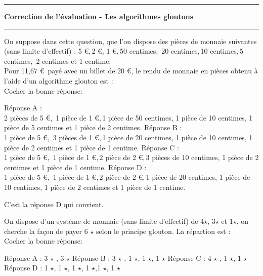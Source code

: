 \documentclass[a4paper,12,answers
]{exam}
\begin{document}
\chead{}

\lfoot{                      }
\hrule

\begin{center}
	\textbf{\Large{Correction de l'évaluation - Les algorithmes gloutons }}\end{center}
\hrule
\vskip0.5cm
	\begin{questions}
	\question On suppose dans cette question, que l'on dispose des pièces de monnaie suivantes (sans limite d'effectif) : 5 \euro,\,2 \euro, 1 \euro,\,50 centimes, \,20 centimes,\,10 centimes,\,5 centimes, \,2 centimes et 1 centime.\\
	Pour 11,67 \euro\, payé avec un billet de 20 \euro, le rendu de monnaie en pièces obtenu à l'aide d'un algorithme glouton est : \\
	Cocher la bonne réponse:
			\begin{checkboxes}
			\choice Réponse A :\\
			2 pièces de 5 \euro, \,1 pièce de 1 \euro,\,1 pièce de 50 centimes, 1 pièce de 10 centimes, 1 pièce de 5 centimes et 1 pièce de 2 centimes.
			\choice Réponse B :\\
			1 pièce de 5 \euro, \,3 pièces de 1 \euro,\,1 pièce de 20 centimes, 1 pièce de 10 centimes, 1 pièce de 2 centimes et 1 pièce de 1 centime.
			\choice Réponse C : \\
			1 pièce de 5 \euro, \,1 pièce de 1 \euro,\,2 pièce de 2 \euro,\,3 pièces de 10 centimes, 1 pièce de 2 centimes et 1 pièce de 1 centime.
			\choice Réponse D :\\ 1 pièce de 5 \euro, \,1 pièce de 1 \euro,\,2 pièce de 2 \euro,\,1 pièce de 20 centimes, 1 pièce de 10 centimes,  1 pièce de 2 centimes et 1 pièce de 1 centime.
		\end{checkboxes}	

\begin{solution}
C'est la réponse D qui  convient.

\end{solution}
\medskip
	\question On dispose d'un système de monnaie (sans limite d'effectif) de 4$\star$, 3$\star$ et 1$\star$, on cherche la façon de payer 6 $\star$ selon le principe glouton. La répartion est : \\
Cocher la bonne réponse:
\begin{checkboxes}
	\choice Réponse A : 3 $\star$ , 3 $\star$
	\choice Réponse B : 3 $\star$ , 1 $\star$, 1 $\star$, 1 $\star$
	\choice Réponse C : 4 $\star$ , 1 $\star$, 1 $\star$
		\choice Réponse D : 1 $\star$, 1 $\star$, 1 $\star$, 1 $\star$,1 $\star$, 1 $\star$
\end{checkboxes}		


\end{questions}
\end{document}
